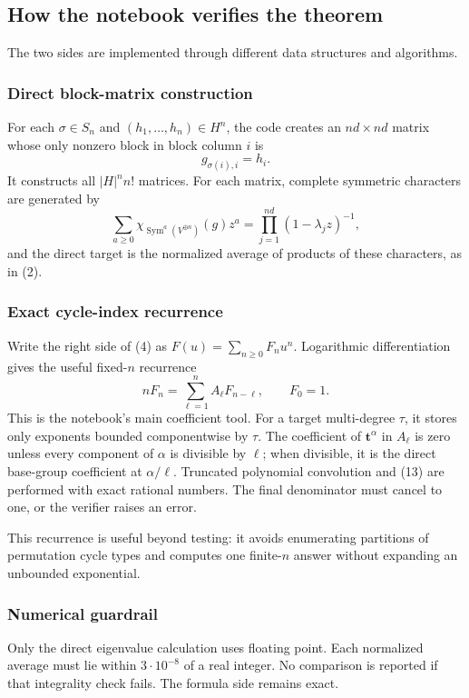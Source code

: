 \documentclass[10pt]{article}
\newcommand{\Sym}{\operatorname{Sym}}
\begin{document}
\subsection{How the notebook verifies the theorem}

The two sides are implemented through different data structures and algorithms.

\subsubsection*{Direct block-matrix construction}

For each $\sigma\in S_n$ and $(h_1,\ldots,h_n)\in H^n$, the code creates an
$nd\times nd$ matrix whose only nonzero block in block column $i$ is
\[
g_{\sigma(i),i}=h_i.
\tag{11}
\]
It constructs all $|H|^n n!$ matrices.  For each matrix, complete symmetric
characters are generated by
\[
\sum_{a\geq0}\chi_{\Sym^a(V^{\oplus n})}(g)z^a
=\prod_{j=1}^{nd}(1-\lambda_jz)^{-1},
\tag{12}
\]
and the direct target is the normalized average of products of these characters,
as in (2).

\subsubsection*{Exact cycle-index recurrence}

Write the right side of (4) as $F(u)=\sum_{n\geq0}F_nu^n$.  Logarithmic
differentiation gives the useful fixed-$n$ recurrence
\[
nF_n=\sum_{\ell=1}^n A_\ell F_{n-\ell},
\qquad F_0=1.
\tag{13}
\]
This is the notebook's main coefficient tool.  For a target multi-degree
$\tau$, it stores only exponents bounded componentwise by $\tau$.  The
coefficient of $\mathbf t^\alpha$ in $A_\ell$ is zero unless every component
of $\alpha$ is divisible by $\ell$; when divisible, it is the direct base-group
coefficient at $\alpha/\ell$.  Truncated polynomial convolution and (13) are
performed with exact rational numbers.  The final denominator must cancel to
one, or the verifier raises an error.

This recurrence is useful beyond testing: it avoids enumerating partitions of
permutation cycle types and computes one finite-$n$ answer without expanding an
unbounded exponential.

\subsubsection*{Numerical guardrail}

Only the direct eigenvalue calculation uses floating point.  Each normalized
average must lie within $3\cdot10^{-8}$ of a real integer.  No comparison is
reported if that integrality check fails.  The formula side remains exact.
\end{document}
